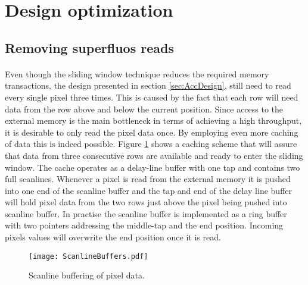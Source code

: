 \section{Design optimization}
\label{sec:Optimization}
\subsection*{Removing superfluos reads}
\label{sec:memaccess}
\paragraph*{}
Even though the sliding window technique reduces the required memory transactions, the design presented in section \ref{sec:AccDesign}, still need to read every single pixel three times. This is caused by the fact that each row will need data from the row above and below the current position. Since access to the external memory is the main bottleneck in terms of achieving a high throughput, it is desirable to only read the pixel data once. By employing even more caching of data this is indeed possible. Figure \ref{fig:ScanlineBuffers} shows a caching scheme that will assure that data from three consecutive rows are available and ready to enter the sliding window. The cache operates as a delay-line buffer with one tap and contains two full scanlines. Whenever a pixel is read from the external memory it is pushed into one end of the scanline buffer and the tap and end of the delay line buffer will hold pixel data from the two rows just above the pixel being pushed into  scanline buffer. In practise the scanline buffer is implemented as a ring buffer with two pointers addressing the middle-tap and the end position. 
Incoming pixels values will overwrite the end position once it is read.

\begin{figure}[H]
	\centering
	\texttt{[image: ScanlineBuffers.pdf]}
	\caption{Scanline buffering of pixel data.}
	\label{fig:ScanlineBuffers}
\end{figure}

